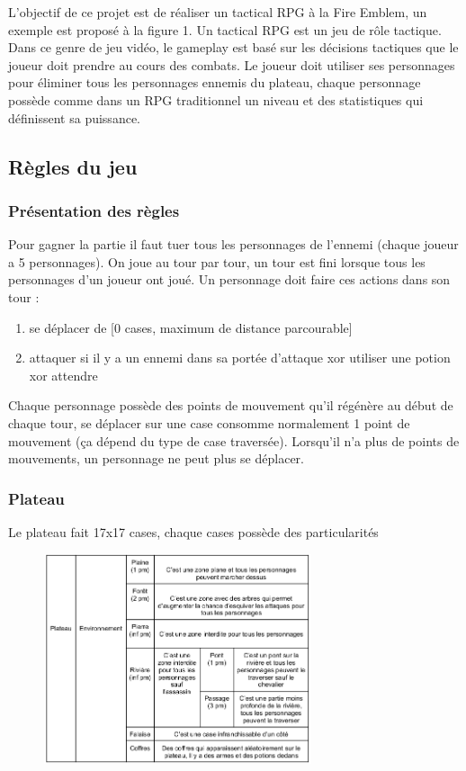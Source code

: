 \documentclass[a4paper,12pt]{article}
\begin{document}
L'objectif de ce projet est de réaliser un tactical RPG à la Fire Emblem, un exemple est proposé à la figure 1. Un tactical RPG est un jeu de rôle tactique. Dans ce genre de jeu vidéo, le gameplay est basé sur les décisions tactiques que le joueur doit prendre au cours des combats. Le joueur doit utiliser ses personnages pour éliminer tous les personnages ennemis du plateau, chaque personnage possède comme dans un RPG traditionnel un niveau et des statistiques qui définissent sa puissance.

\subsection{Règles du jeu}
\subsubsection{Présentation des règles}
Pour gagner la partie il faut tuer tous les personnages de l'ennemi (chaque joueur a 5 personnages). On joue au tour par tour, un tour est fini lorsque tous les personnages d’un joueur ont joué.
Un personnage doit faire ces actions dans son tour :
\begin{enumerate}
  \item se déplacer de [0 cases, maximum de distance parcourable]
  \item attaquer si il y a un ennemi dans sa portée d’attaque xor utiliser une potion xor attendre
\end{enumerate}
Chaque personnage possède des points de mouvement qu’il régénère au début de chaque tour, se déplacer sur une case consomme normalement 1 point de mouvement (ça dépend du type de case traversée). Lorsqu’il n’a plus de points de mouvements, un personnage ne peut plus se déplacer.
\subsubsection{Plateau}
Le plateau fait 17x17 cases, chaque cases possède des particularités
\begin{figure}[ht]
\begin{center}
\includegraphics[width=0.7\textwidth]{tableauplateau.png}
\end{center}
\end{figure}
\newpage
\end{document}
